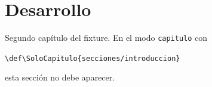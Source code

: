 \section{Desarrollo}

Segundo capítulo del fixture. En el modo \texttt{capitulo} con

\smallskip
\noindent\verb|\def\SoloCapitulo{secciones/introduccion}|
\smallskip

\noindent esta sección no debe aparecer.
